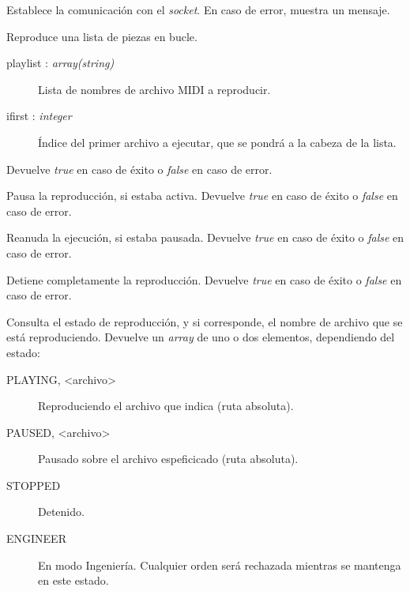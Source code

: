 \begin{description}[style=nextline]
	\item[driver ()]
	Establece la comunicación con el \textit{socket}. En caso de error, muestra un mensaje.
	
	\item[driver\_play (playlist, ifirst) : \textit{boolean}]
	Reproduce una lista de piezas en bucle.
	
	\begin{description}
		\item[playlist : \textit{array(string)}] Lista de nombres de archivo \acrshort{MIDI} a reproducir.
		\item[ifirst : \textit{integer}] Índice del primer archivo a ejecutar, que se pondrá a la cabeza de la lista.
	\end{description}
	
	Devuelve \textit{true} en caso de éxito o \textit{false} en caso de error.
	
	\item[driver\_pause () : \textit{boolean}]
	Pausa la reproducción, si estaba activa. Devuelve \textit{true} en caso de éxito o \textit{false} en caso de error.
	
	\item[driver\_resume () : \textit{boolean}]
	Reanuda la ejecución, si estaba pausada. Devuelve \textit{true} en caso de éxito o \textit{false} en caso de error.
	
	\item[driver\_stop () : \textit{boolean}]
	Detiene completamente la reproducción. Devuelve \textit{true} en caso de éxito o \textit{false} en caso de error.
	
	\item[driver\_status () : \textit{array}]
	Consulta el estado de reproducción, y si corresponde, el nombre de archivo que se está reproduciendo. Devuelve un \textit{array} de uno o dos elementos, dependiendo del estado:
	
	\begin{description}
		\item[PLAYING, <archivo>] Reproduciendo el archivo que indica (ruta absoluta).
		\item[PAUSED, <archivo>] Pausado sobre el archivo espeficicado (ruta absoluta).
		\item[STOPPED] Detenido.
		\item[ENGINEER] En modo Ingeniería. Cualquier orden será rechazada mientras se mantenga en este estado.
	\end{description}
	
\end{description}


